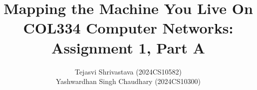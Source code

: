 \documentclass{template}
\begin{document}

\title{\huge{Mapping the Machine You Live On}\\[0.3em]\normalsize COL334 Computer Networks: Assignment 1, Part A}
\author{Tejasvi Shrivastava (2024CS10582) \\ Yashwardhan Singh Chaudhary (2024CS10300)}










\end{document}
